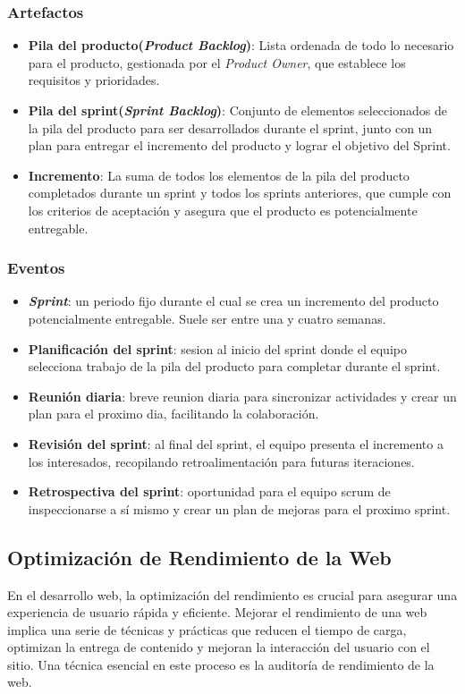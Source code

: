 \subsubsection{Artefactos}
\begin{itemize}
	\item \textbf{Pila del producto(\textit{Product Backlog})}: Lista ordenada de todo lo necesario para el producto, gestionada por el \textit{Product Owner}, que establece los requisitos y prioridades.
	\item \textbf{Pila del sprint(\textit{Sprint Backlog})}: Conjunto de elementos seleccionados de la pila del producto para ser desarrollados durante el sprint, junto con un plan para entregar el incremento del producto y lograr el objetivo del Sprint.
	\item \textbf{Incremento}: La suma de todos los elementos de la pila del producto completados durante un sprint y todos los sprints anteriores, que cumple con los criterios de aceptación y asegura que el producto es potencialmente entregable.
\end{itemize}

\subsubsection{Eventos}
\begin{itemize}
	\item \textbf{\textit{Sprint}}: un periodo fijo durante el cual se crea un incremento del producto potencialmente entregable. Suele ser entre una y cuatro semanas.
	\item \textbf{Planificación del sprint}: sesion al inicio del sprint donde el equipo selecciona trabajo de la pila del producto para completar durante el sprint.
	\item \textbf{Reunión diaria}: breve reunion diaria para sincronizar actividades y crear un plan para el proximo dia, facilitando la colaboración.
	\item \textbf{Revisión del sprint}: al final del sprint, el equipo presenta el incremento a los interesados, recopilando retroalimentación para futuras iteraciones.
	\item \textbf{Retrospectiva del sprint}: oportunidad para el equipo scrum de inspeccionarse a sí mismo y crear un plan de mejoras para el proximo sprint.
\end{itemize}

\subsection{Optimización de Rendimiento de la Web}
En el desarrollo web, la optimización del rendimiento es crucial para asegurar una experiencia de usuario rápida y eficiente. Mejorar el rendimiento de una web implica una serie de técnicas y prácticas que reducen el tiempo de carga, optimizan la entrega de contenido y mejoran la interacción del usuario con el sitio. Una técnica esencial en este proceso es la auditoría de rendimiento de la web.
